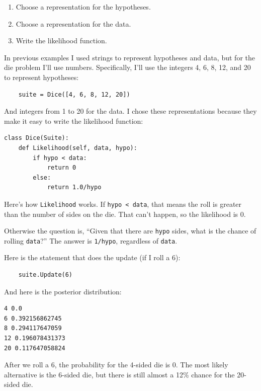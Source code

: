 \documentclass[12pt]{book}
\begin{document}
\begin{enumerate}

\item Choose a representation for the hypotheses.

\item Choose a representation for the data.

\item Write the likelihood function.

\end{enumerate}

In previous examples I used strings to represent hypotheses and
data, but for the die problem I'll use numbers.  Specifically,
I'll use the integers 4, 6, 8, 12, and 20 to represent hypotheses:

\begin{verbatim}
    suite = Dice([4, 6, 8, 12, 20])
\end{verbatim}

And integers from 1 to 20 for the data.
I chose these representations because they make it easy to
write the likelihood function:

\begin{verbatim}
class Dice(Suite):
    def Likelihood(self, data, hypo):
        if hypo < data:
            return 0
        else:
            return 1.0/hypo
\end{verbatim}

Here's how \verb"Likelihood" works.  If \verb"hypo < data", that
means the roll is greater than the number of sides on the die.
That can't happen, so the likelihood is 0.

Otherwise the question is, ``Given that there are {\tt hypo}
sides, what is the chance of rolling {\tt data}?''  The
answer is \verb"1/hypo", regardless of {\tt data}.

Here is the statement that does the update (if I roll a 6):

\begin{verbatim}
    suite.Update(6)
\end{verbatim}

And here is the posterior distribution:

\begin{verbatim}
4 0.0
6 0.392156862745
8 0.294117647059
12 0.196078431373
20 0.117647058824
\end{verbatim}

After we roll a 6, the probability for the 4-sided die is 0.  The
most likely alternative is the 6-sided die, but there is still
almost a 12\% chance for the 20-sided die.
\end{document}
